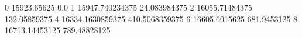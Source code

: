 0 15923.65625 0.0
1 15947.740234375 24.083984375
2 16055.71484375 132.05859375
4 16334.1630859375 410.5068359375
6 16605.6015625 681.9453125
8 16713.14453125 789.48828125
